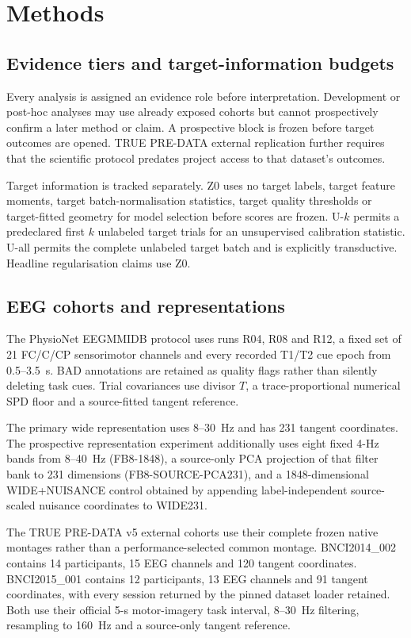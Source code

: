 \section{Methods}

\subsection{Evidence tiers and target-information budgets}
Every analysis is assigned an evidence role before interpretation.
Development or post-hoc analyses may use already exposed cohorts but cannot
prospectively confirm a later method or claim. A prospective block is frozen
before target outcomes are opened. TRUE PRE-DATA external replication further
requires that the scientific protocol predates project access to that
dataset's outcomes.

Target information is tracked separately. Z0 uses no target labels, target
feature moments, target batch-normalisation statistics, target quality
thresholds or target-fitted geometry for model selection before scores are
frozen. U-\(k\) permits a predeclared first \(k\) unlabeled target trials
for an unsupervised calibration statistic. U-all permits the complete
unlabeled target batch and is explicitly transductive. Headline
regularisation claims use Z0.

\subsection{EEG cohorts and representations}
The PhysioNet EEGMMIDB protocol uses runs R04, R08 and R12, a fixed set of 21
FC/C/CP sensorimotor channels and every recorded T1/T2 cue epoch from
0.5--3.5~s. BAD annotations are retained as quality flags rather than
silently deleting task cues. Trial covariances use divisor \(T\), a
trace-proportional numerical SPD floor and a source-fitted tangent reference.

The primary wide representation uses 8--30~Hz and has 231 tangent
coordinates. The prospective representation experiment additionally uses
eight fixed 4-Hz bands from 8--40~Hz (FB8-1848), a source-only PCA projection
of that filter bank to 231 dimensions (FB8-SOURCE-PCA231), and a
1848-dimensional WIDE+NUISANCE control obtained by appending
label-independent source-scaled nuisance coordinates to WIDE231.

The TRUE PRE-DATA v5 external cohorts use their complete frozen native
montages rather than a performance-selected common montage.
BNCI2014\_002 contains 14 participants, 15 EEG channels and 120 tangent
coordinates. BNCI2015\_001 contains 12 participants, 13 EEG channels and
91 tangent coordinates, with every session returned by the pinned dataset
loader retained. Both use their official 5-s motor-imagery task interval,
8--30~Hz filtering, resampling to 160~Hz and a source-only tangent reference.

